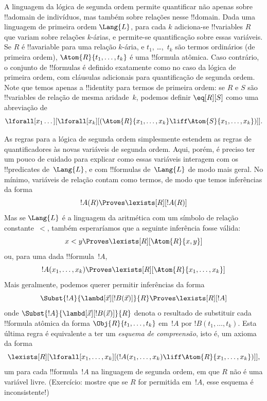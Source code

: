 \documentclass[../../../include/open-logic-section]{subfiles}
\begin{document}


A linguagem da lógica de segunda ordem permite quantificar não apenas
sobre !!a{domain} de indivíduos, mas também sobre relações nesse
!!{domain}. Dada uma linguagem de primeira ordem $\Lang{L}$, para cada
$k$ adiciona-se !!{variable}s $R$ que variam sobre relações $k$-árias, e
permite-se quantificação sobre essas variáveis. Se $R$ é !!a{variable} para uma
relação $k$-ária, e $t_1$, \dots,~$t_k$ são termos ordinários (de primeira ordem),
$\Atom{R}{t_1,\dots,t_k}$ é uma !!{formula} atômica. Caso contrário, o conjunto de
!!{formula}s é definido exatamente como no caso da lógica de primeira ordem, com
cláusulas adicionais para quantificação de segunda ordem. Note que temos apenas
a !!{identity} para termos de primeira ordem: se $R$ e $S$ são !!{variable}s de relação
de mesma aridade~$k$, podemos definir $\eq[R][S]$ como uma
abreviação de
\[
\lforall[x_1 \dots][\lforall[x_k][(\Atom{R}{x_1, \dots, x_k} \liff
  \Atom{S}{x_1, \dots, x_k})]].
\]

As regras para a lógica de segunda ordem simplesmente estendem as regras de quantificadores
às novas variáveis de segunda ordem. Aqui, porém, é preciso ter um pouco
de cuidado para explicar como essas variáveis interagem com os !!{predicate}s
de~$\Lang{L}$, e com !!{formula}s de~$\Lang{L}$ de modo mais geral. No mínimo,
variáveis de relação contam como termos, de modo que temos inferências da
forma
\[
!A(R) \Proves \lexists[R][!A(R)]
\]
Mas se $\Lang{L}$ é a linguagem da aritmética com um símbolo de relação
constante~$<$, também esperaríamos que a seguinte inferência fosse
válida:
\[
x < y \Proves \lexists[R][\Atom{R}{x,y}]
\]
ou, para uma dada !!{formula}~$!A$,
\[
!A(x_1, \dots, x_k) \Proves \lexists[R][\Atom{R}{x_1,\dots,x_k}]
\]
Mais geralmente, podemos querer permitir inferências da forma
\[
\Subst{!A}{\lambd[\vec x][!B(\vec x)]}{R} \Proves
\lexists[R][!A]
\]
onde $\Subst{!A}{\lambd[\vec x][!B(\vec x)]}{R}$ denota o resultado
de substituir cada !!{formula} atômica da forma
$\Obj{R}{t_1,\dots,t_k}$ em~$!A$ por $!B(t_1, \dots, t_k)$. Esta última
regra é equivalente a ter um {\em esquema de compreensão}, isto é, um
axioma da forma
\[
\lexists[R][\lforall[x_1, \dots, x_k][(!A(x_1, \dots, x_k) \liff
\Atom{R}{x_1, \dots, x_k})]],
\]
um para cada !!{formula}~$!A$ na linguagem de segunda ordem, em que
$R$ não é uma variável livre. (Exercício: mostre que se $R$ for permitida
em~$!A$, esse esquema é inconsistente!)
\end{document}
